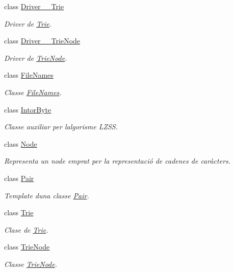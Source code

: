 \begin{DoxyCompactItemize}
class \hyperlink{classdomini_1_1utils_1_1Driver____Trie}{Driver\+\_\+\+\_\+\+Trie}
\begin{DoxyCompactList}\small\item\em Driver de \hyperlink{classdomini_1_1utils_1_1Trie}{Trie}. \end{DoxyCompactList}\item 
class \hyperlink{classdomini_1_1utils_1_1Driver____TrieNode}{Driver\+\_\+\+\_\+\+Trie\+Node}
\begin{DoxyCompactList}\small\item\em Driver de \hyperlink{classdomini_1_1utils_1_1TrieNode}{Trie\+Node}. \end{DoxyCompactList}\item 
class \hyperlink{classdomini_1_1utils_1_1FileNames}{File\+Names}
\begin{DoxyCompactList}\small\item\em Classe \hyperlink{classdomini_1_1utils_1_1FileNames}{File\+Names}. \end{DoxyCompactList}\item 
class \hyperlink{classdomini_1_1utils_1_1IntorByte}{Intor\+Byte}
\begin{DoxyCompactList}\small\item\em Classe auxiliar per l\textquotesingle{}algorisme L\+Z\+SS. \end{DoxyCompactList}\item 
class \hyperlink{classdomini_1_1utils_1_1Node}{Node}
\begin{DoxyCompactList}\small\item\em Representa un node emprat per la representació de cadenes de caràcters. \end{DoxyCompactList}\item 
class \hyperlink{classdomini_1_1utils_1_1Pair}{Pair}
\begin{DoxyCompactList}\small\item\em Template d\textquotesingle{}una classe \hyperlink{classdomini_1_1utils_1_1Pair}{Pair}. \end{DoxyCompactList}\item 
class \hyperlink{classdomini_1_1utils_1_1Trie}{Trie}
\begin{DoxyCompactList}\small\item\em Clase de \hyperlink{classdomini_1_1utils_1_1Trie}{Trie}. \end{DoxyCompactList}\item 
class \hyperlink{classdomini_1_1utils_1_1TrieNode}{Trie\+Node}
\begin{DoxyCompactList}\small\item\em Classe \hyperlink{classdomini_1_1utils_1_1TrieNode}{Trie\+Node}. \end{DoxyCompactList}\end{DoxyCompactItemize}
